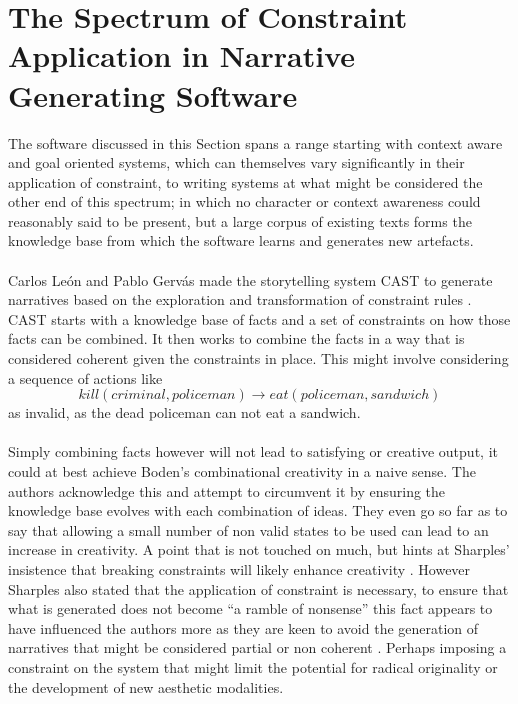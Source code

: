 \documentclass[letterpaper]{article}
\begin{document}
\section{The Spectrum of Constraint Application in Narrative Generating Software} \label{sec:spectrum}
The software discussed in this Section spans a range starting with context aware and goal oriented systems, which can themselves vary significantly in their application of constraint, to writing systems at what might be considered the other end of this spectrum; in which no character or context awareness could reasonably said to be present, but a large corpus of existing texts forms the knowledge base from which the software learns and generates new artefacts.\\
\\Carlos Le\'on and Pablo Gerv\'as made the storytelling system CAST to generate narratives based on the exploration and transformation of constraint rules \cite{leon2008creative}. CAST starts with a knowledge base of facts and a set of constraints on how those facts can be combined. It then works to combine the facts in a way that is considered coherent given the constraints in place. This might involve considering a sequence of actions like\\
\begin{equation}
kill(criminal, policeman) \rightarrow eat(policeman, sandwich) 
\end{equation}
as invalid, as the dead policeman can not eat a sandwich. \\
\\Simply combining facts however will not lead to satisfying or creative output, it could at best achieve Boden's combinational creativity in a naive sense. The authors acknowledge this and attempt to circumvent it by ensuring the knowledge base evolves with each combination of ideas. They even go so far as to say that allowing a small number of non valid states to be used can lead to an increase in creativity. A point that is not touched on much, but hints at Sharples' insistence that breaking constraints will likely enhance creativity \cite{Sharples96anaccount}. However Sharples also stated that the application of constraint is necessary, to ensure that what is generated does not become \enquote{a ramble of nonsense} this fact appears to have influenced the authors more as they are keen to avoid the generation of narratives that might be considered partial or non coherent \cite{leon2008creative}. Perhaps imposing a constraint on the system that might limit the potential for radical originality or the development of new aesthetic modalities.\\
\end{document}
